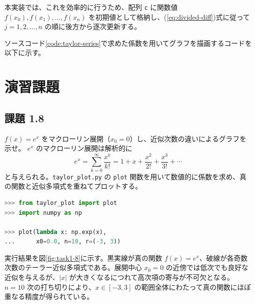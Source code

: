 \documentclass[12pt,a4paper]{ltjsreport}
\begin{document}
本実装では、これを効率的に行うため、配列 \texttt{c} に関数値 $f(x_0), f(x_1), \ldots, f(x_n)$ を初期値として格納し、(\ref{eq:divided-diff})式に従って $j = 1, 2, \ldots, n$ の順に後方から逐次更新する。

\begin{algorithm}[H]
\caption{Taylor係数の数値計算（Newton差分商）}
\BlankLine
{}
\end{algorithm}


ソースコード\ref{code:taylor-series}で求めた係数を用いてグラフを描画するコードを以下に示す。


\section{演習課題}

\subsection*{課題 1.8}
$f(x) = e^x$ をマクローリン展開（$x_0 = 0$）し、近似次数の違いによるグラフを示せ。
$e^x$ のマクローリン展開は解析的に
\begin{equation}
e^x = \sum_{k=0}^{\infty} \frac{x^k}{k!}
= 1 + x + \frac{x^2}{2!} + \frac{x^3}{3!} + \cdots
\end{equation}
と与えられる。\texttt{taylor\_plot.py} の \texttt{plot} 関数を用いて数値的に係数を求め、真の関数と近似多項式を重ねてプロットする。

\bigskip
\begin{lstlisting}[language=Python, numbers=none]
>>> from taylor_plot import plot
>>> import numpy as np

>>> plot(lambda x: np.exp(x),
...      x0=0.0, n=10, r=(-3, 3))
\end{lstlisting}

実行結果を図\ref{fig:task1-8}に示す。黒実線が真の関数 $f(x) = e^x$、破線が各奇数次数のテーラー近似多項式である。展開中心 $x_0 = 0$ の近傍では低次でも良好な近似を与えるが、$|x|$ が大きくなるにつれて高次項の寄与が不可欠となる。$n = 10$ 次の打ち切りにより、$x \in [-3, 3]$ の範囲全体にわたって真の関数にほぼ重なる精度が得られている。
\end{document}
